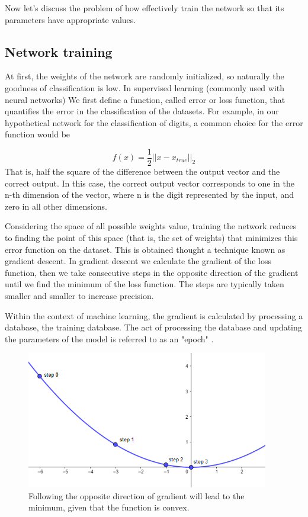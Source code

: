\documentclass[a4paper]{report}
\begin{document}
Now let's discuss the problem of how effectively train the network so that its parameters have appropriate values.

\subsection{Network training}
At first, the weights of the network are randomly initialized, so naturally the goodness of classification is low.
In supervised learning (commonly used with neural networks) We first define a function, called error or loss function, that quantifies the error in the classification of the datasets.
For example, in our hypothetical network for the classification of digits, a common choice for the error function would be

\begin{equation}
f(x)=\frac{1}{2}||x-x_{true}||_2
\label{true}
\end{equation}
That is, half the square of the difference between the output vector and the correct output.
In this case, the correct output vector corresponds to one in the n-th dimension of the vector, where n is the digit represented by the input, and zero in all other dimensions.

Considering the space of all possible weights value, training the network reduces to finding the point of this space (that is, the set of weights) that minimizes this error function on the dataset.
This is obtained thought a technique known as gradient descent.
In gradient descent we calculate the gradient of the loss function, then we take consecutive steps in the opposite direction of the gradient until we find the minimum of the loss function.
The steps are typically taken smaller and smaller to increase precision.

Within the context of machine learning, the gradient is calculated by processing a database, the training database. The act of processing the database and updating the parameters of the model is referred to as an "epoch" \cite{spall2005introduction}.

\begin{figure}[H]
\centering
\includegraphics[height=6cm]{o/gradient.png}
\caption{Following the opposite direction of gradient will lead to the minimum, given that the function is convex.}
\end{figure}
\end{document}
